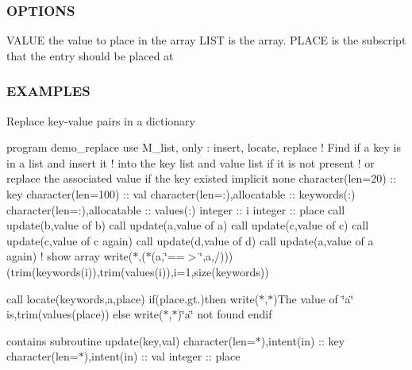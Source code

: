 \subsubsection*{O\+P\+T\+I\+O\+NS}

\begin{DoxyVerb}VALUE         the value to place in the array
LIST          is the array.
PLACE         is the subscript that the entry should be placed at
\end{DoxyVerb}


\subsubsection*{E\+X\+A\+M\+P\+L\+ES}

Replace key-\/value pairs in a dictionary

program demo\+\_\+replace use M\+\_\+list, only \+: insert, locate, replace ! Find if a key is in a list and insert it ! into the key list and value list if it is not present ! or replace the associated value if the key existed implicit none character(len=20) \+:\+: key character(len=100) \+:\+: val character(len=\+:),allocatable \+:\+: keywords(\+:) character(len=\+:),allocatable \+:\+: values(\+:) integer \+:\+: i integer \+:\+: place call update(\textquotesingle{}b\textquotesingle{},\textquotesingle{}value of b\textquotesingle{}) call update(\textquotesingle{}a\textquotesingle{},\textquotesingle{}value of a\textquotesingle{}) call update(\textquotesingle{}c\textquotesingle{},\textquotesingle{}value of c\textquotesingle{}) call update(\textquotesingle{}c\textquotesingle{},\textquotesingle{}value of c again\textquotesingle{}) call update(\textquotesingle{}d\textquotesingle{},\textquotesingle{}value of d\textquotesingle{}) call update(\textquotesingle{}a\textquotesingle{},\textquotesingle{}value of a again\textquotesingle{}) ! show array write($\ast$,\textquotesingle{}($\ast$(a,\char`\"{}==$>$\char`\"{},a,/))\textquotesingle{})(trim(keywords(i)),trim(values(i)),i=1,size(keywords))

call locate(keywords,\textquotesingle{}a\textquotesingle{},place) if(place.\+gt.)then write($\ast$,$\ast$)\textquotesingle{}The value of \char`\"{}a\char`\"{} is\textquotesingle{},trim(values(place)) else write($\ast$,$\ast$)\textquotesingle{}\char`\"{}a\char`\"{} not found\textquotesingle{} endif

contains subroutine update(key,val) character(len=$\ast$),intent(in) \+:\+: key character(len=$\ast$),intent(in) \+:\+: val integer \+:\+: place

